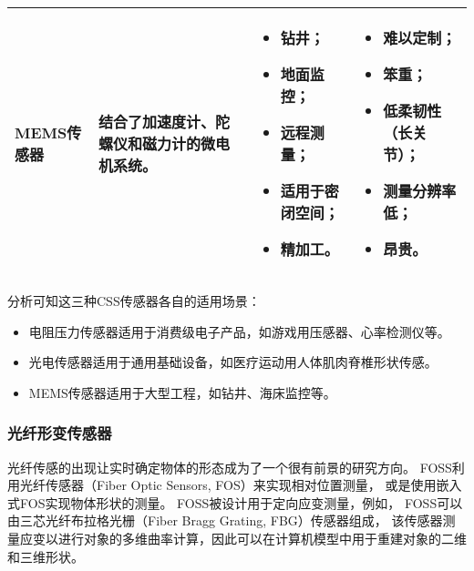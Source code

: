 \begin{table}[h]
\begin{center}
\begin{tabular}{p{}p{}p{}p{}}
\midrule

MEMS传感器 & 结合了加速度计、陀螺仪和磁力计的微电机系统。&
\begin{minipage}[t]{0.24\textwidth}
\begin{itemize}
\setlength{\itemsep}{0pt}
\setlength{\parsep}{0pt}
\setlength{\parskip}{0pt}
    \item 钻井；
    \item 地面监控；
    \item 远程测量；
    \item 适用于密闭空间；
    \item 精加工。
\end{itemize}
\end{minipage}
& 
\begin{minipage}[t]{0.24\textwidth}
\begin{itemize}
\setlength{\itemsep}{0pt}
\setlength{\parsep}{0pt}
\setlength{\parskip}{0pt}
    \item 难以定制；
    \item 笨重；
    \item 低柔韧性（长关节）；
    \item 测量分辨率低；
    \item 昂贵。
\end{itemize} 
\end{minipage} \\
\bottomrule
\end{tabular}
\end{center}
\end{table}

分析可知这三种CSS传感器各自的适用场景：

\begin{itemize}
    \item 电阻压力传感器适用于消费级电子产品，如游戏用压感器、心率检测仪等。
    \item 光电传感器适用于通用基础设备，如医疗运动用人体肌肉脊椎形状传感。
    \item MEMS传感器适用于大型工程，如钻井、海床监控等。
\end{itemize}

\FloatBarrier
\subsubsection{光纤形变传感器}
光纤传感的出现让实时确定物体的形态成为了一个很有前景的研究方向。
FOSS利用光纤传感器（Fiber Optic Sensors, FOS）来实现相对位置测量，
或是使用嵌入式FOS实现物体形状的测量。
FOSS被设计用于定向应变测量，例如，
FOSS可以由三芯光纤布拉格光栅（Fiber Bragg Grating, FBG）传感器组成，
该传感器测量应变以进行对象的多维曲率计算，因此可以在计算机模型中用于重建对象的二维和三维形状。

